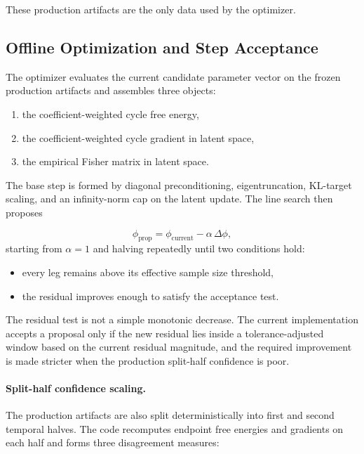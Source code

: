 These production artifacts are the only data used by the optimizer.

\subsection{Offline Optimization and Step Acceptance}

The optimizer evaluates the current candidate parameter vector on the frozen production artifacts and assembles three objects:

\begin{enumerate}
    \item the coefficient-weighted cycle free energy,
    \item the coefficient-weighted cycle gradient in latent space,
    \item the empirical Fisher matrix in latent space.
\end{enumerate}

The base step is formed by diagonal preconditioning, eigentruncation, KL-target scaling, and an infinity-norm cap on the latent update. The line search then proposes

\begin{equation}
    \phi_{\mathrm{prop}}
    =
    \phi_{\mathrm{current}}
    -
    \alpha \, \Delta \phi,
\end{equation}
%
starting from $\alpha=1$ and halving repeatedly until two conditions hold:

\begin{itemize}
    \item every leg remains above its effective sample size threshold,
    \item the residual improves enough to satisfy the acceptance test.
\end{itemize}

The residual test is not a simple monotonic decrease. The current implementation accepts a proposal only if the new residual lies inside a tolerance-adjusted window based on the current residual magnitude, and the required improvement is made stricter when the production split-half confidence is poor.

\paragraph{Split-half confidence scaling.}
The production artifacts are also split deterministically into first and second temporal halves. The code recomputes endpoint free energies and gradients on each half and forms three disagreement measures:

